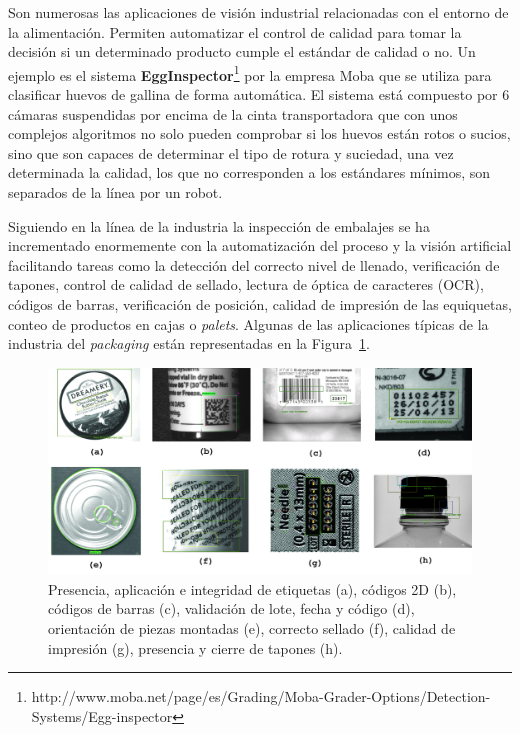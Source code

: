 Son numerosas las aplicaciones de visión industrial relacionadas con el entorno de la alimentación. Permiten automatizar el control de calidad para tomar la decisión si un determinado producto cumple el estándar de calidad o no. Un ejemplo es el sistema \textbf{EggInspector}\footnote{http://www.moba.net/page/es/Grading/Moba-Grader-Options/Detection-Systems/Egg-inspector} por la empresa Moba que se utiliza para clasificar huevos de gallina de forma automática. El sistema está compuesto por 6 cámaras suspendidas por encima de la cinta transportadora que con unos complejos algoritmos no solo pueden comprobar si los huevos están rotos o sucios, sino que son capaces de determinar el tipo de rotura y suciedad, una vez determinada la calidad, los que no corresponden a los estándares mínimos, son separados de la línea por un robot.

Siguiendo en la línea de la industria la inspección de embalajes se ha incrementado enormemente con la automatización del proceso y la visión artificial facilitando tareas como la detección del correcto nivel de llenado, verificación de tapones, control de calidad de sellado, lectura de óptica de caracteres (OCR), códigos de barras, verificación de posición, calidad de impresión de las equiquetas, conteo de productos en cajas o \textit{palets}. Algunas de las aplicaciones típicas de la industria del \textit{packaging} están representadas en la Figura~\ref{fig:Industry}.

\begin{figure}[th]
\centering
\includegraphics[scale=0.17]{Figures/industry.png}
\decoRule
\caption[Visión en la industria]{Presencia, aplicación e integridad de etiquetas (a), códigos 2D (b), códigos de barras (c), validación de lote, fecha y código (d), orientación de piezas montadas (e), correcto sellado (f), calidad de impresión (g), presencia y cierre de tapones (h). }
\label{fig:Industry}
\end{figure}


